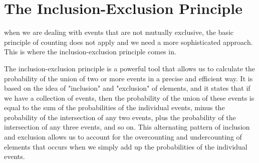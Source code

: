 \documentclass{report}
\begin{document}

        \section{The Inclusion-Exclusion Principle} 

        when we are dealing with events that are not mutually exclusive, the basic principle of counting does not apply and we need a more sophisticated approach. This is where the inclusion-exclusion principle comes in.

The inclusion-exclusion principle is a powerful tool that allows us to calculate the probability of the union of two or more events in a precise and efficient way. It is based on the idea of "inclusion" and "exclusion" of elements, and it states that if we have a collection of events, then the probability of the union of these events is equal to the sum of the probabilities of the individual events, minus the probability of the intersection of any two events, plus the probability of the intersection of any three events, and so on. This alternating pattern of inclusion and exclusion allows us to account for the overcounting and undercounting of elements that occurs when we simply add up the probabilities of the individual events.

\end{document}
